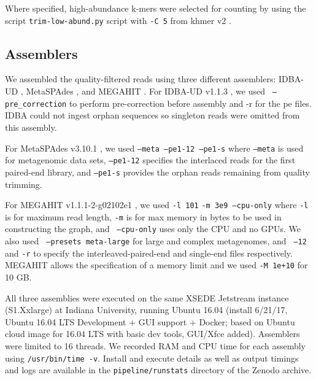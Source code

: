 \documentclass[11pt]{article}
\begin{document}

Where specified, high-abundance k-mers were selected for counting by
using the script {\tt trim-low-abund.py} script with {\tt -C 5} from
khmer v2 \cite{streaming, khmer2}.


\subsection*{Assemblers}

We assembled the quality-filtered reads using three different
assemblers: IDBA-UD \cite{idba}, MetaSPAdes \cite{metaspades}, and MEGAHIT
\cite{megahit}.  For IDBA-UD v1.1.3 \cite{idba}, we used {\tt
  {--pre\_correction}} to perform pre-correction before assembly and
-r for the pe files.  IDBA could not ingest orphan sequences so
singleton reads were omitted from this assembly.


For MetaSPAdes v3.10.1 \cite{metaspades}, we used { \tt {--meta --pe1-12
    --pe1-s}} where {\tt{--meta}} is used for
metagenomic data sets, {\tt{--pe1-12}} specifies the interlaced reads
for the first paired-end library, and {\tt{--pe1-s}} provides the
orphan reads remaining from quality trimming.


For MEGAHIT v1.1.1-2-g02102e1 \cite{megahit}, we used {\tt -l 101} {\tt{-m 3e9
    --cpu-only}} where {\tt -l} is for maximum read length, {\tt -m} is
for max memory in bytes to be used in constructing the graph, and {\tt
  {--cpu-only}} uses only the CPU and no GPUs. We also used {\tt
  {--presets meta-large}} for large and complex metagenomes, and {\tt
  {--12} } and {\tt{-r}} to specify the
interleaved-paired-end and single-end files respectively.  MEGAHIT allows
the specification of a memory limit and we used {\tt -M 1e+10} for 10 GB.


All three assemblies were executed on the same XSEDE Jetstream
instance (S1.Xxlarge) at Indiana University, running Ubuntu 16.04
(install 6/21/17, Ubuntu 16.04 LTS Development + GUI support + Docker;
based on Ubuntu cloud image for 16.04 LTS with basic dev tools,
GUI/Xfce added).  Assemblers were limited to 16 threads.  We recorded
RAM and CPU time for each assembly using {\tt /usr/bin/time -v}.
Install and execute details as well as output timings and logs are
available in the {\tt pipeline/runstats} directory of the Zenodo
archive.
\end{document}
